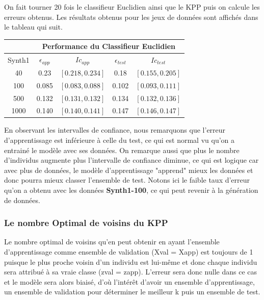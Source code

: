 \documentclass[10pt]{article}
\begin{document}
			On fait tourner 20 fois le classifieur Euclidien ainsi que le KPP puis on calcule les erreurs obtenus. Les résultats obtenus pour les jeux de données sont affichés dans le tableau qui suit.
			\begin{center}		
				\begin{tabular}{ | c | c| c | c | c |}
						\rowcolor{lightgray} 
				   	&  \multicolumn{4}{|c|}{ Performance du  Classifieur Euclidien}\\
					
					\hline
					 Synth1  &  $\epsilon_{app}$ &  $Ic_{app}$&  $\epsilon_{test}$ &  $Ic_{test}$  \\
					\hline
					\multirow{1}{*}{40}   & 0.23  & $[0.218, 0.234]$& 0.18      & 	$[0.155, 0.205]$ \\
															
					\hline
					\multirow{1}{*}{100}      &0.085  &   $[0.083, 0.088  ]$& 0.102     & 	$[0.093, 0.111]$  \\
				
					\hline
					\multirow{1}{*}{500}     & 0.132 &   $[0.131, 0.132]$& 0.134    & 	$[0.132, 0.136]$	\\
				
					\hline
					\multirow{1}{*}{1000}    & 0.140     & $[0.140, 0.141]$ &  0.147   & $[0.146, 0.147]$  	\\
				
					\hline
				\end{tabular}
			\end{center}
		\vspace{1.5mm}
			En observant les intervalles de confiance, nous remarquons que l'erreur d'apprentissage est inférieure à celle du test, ce qui est normal vu qu'on a entrainé le modèle avec ses données. On remarque aussi que plus le nombre d'individus augmente plus l'intervalle de confiance diminue, ce qui est logique car avec plus de données, le modèle d'apprentissage "apprend" mieux les données et donc pourra mieux classer l'ensemble de test. Notons ici le faible taux d'erreur qu'on a obtenu avec les données \textbf{Synth1-100}, ce qui peut revenir à la génération de données.
			 
				\subsubsection{Le nombre Optimal de voisins du KPP }
				Le nombre optimal de voisins qu'en peut obtenir en ayant l'ensemble d'apprentissage comme ensemble de validation (Xval = Xapp) est toujours de 1 puisque le plus proche voisin d'un individu est lui-même et donc chaque individu sera attribué à sa vraie classe (zval = zapp). L'erreur sera donc nulle dans ce cas et le modèle sera alors biaisé, d'où l'intérêt d'avoir un ensemble d'apprentissage, un ensemble de validation pour déterminer le meilleur k puis un ensemble de test.
			
\end{document}
